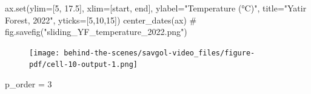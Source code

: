 \documentclass[
  letterpaper,
  DIV=11,
  numbers=noendperiod,
  oneside]{scrreprt}
\newenvironment{Shaded}{\begin{snugshade}}{\end{snugshade}}
\newcommand{\BuiltInTok}[1]{\textcolor[rgb]{0.00,0.23,0.31}{#1}}
\newcommand{\CommentTok}[1]{\textcolor[rgb]{0.37,0.37,0.37}{#1}}
\newcommand{\DecValTok}[1]{\textcolor[rgb]{0.68,0.00,0.00}{#1}}
\newcommand{\FloatTok}[1]{\textcolor[rgb]{0.68,0.00,0.00}{#1}}
\newcommand{\NormalTok}[1]{\textcolor[rgb]{0.00,0.23,0.31}{#1}}
\newcommand{\OperatorTok}[1]{\textcolor[rgb]{0.37,0.37,0.37}{#1}}
\newcommand{\StringTok}[1]{\textcolor[rgb]{0.13,0.47,0.30}{#1}}
\begin{document}
\begin{Shaded}
\begin{Highlighting}[]
\NormalTok{ax.}\BuiltInTok{set}\NormalTok{(ylim}\OperatorTok{=}\NormalTok{[}\DecValTok{5}\NormalTok{, }\FloatTok{17.5}\NormalTok{],}
\NormalTok{       xlim}\OperatorTok{=}\NormalTok{[start, end],}
\NormalTok{       ylabel}\OperatorTok{=}\StringTok{"Temperature (°C)"}\NormalTok{,}
\NormalTok{       title}\OperatorTok{=}\StringTok{"Yatir Forest, 2022"}\NormalTok{,}
\NormalTok{       yticks}\OperatorTok{=}\NormalTok{[}\DecValTok{5}\NormalTok{,}\DecValTok{10}\NormalTok{,}\DecValTok{15}\NormalTok{])}
\NormalTok{center\_dates(ax)}
\CommentTok{\# fig.savefig("sliding\_YF\_temperature\_2022.png")}




\end{Highlighting}
\end{Shaded}

\begin{figure}[H]

{\centering \texttt{[image: behind-the-scenes/savgol-video\_files/figure-pdf/cell-10-output-1.png]}

}

\end{figure}

\begin{Shaded}
\begin{Highlighting}[]
\NormalTok{p\_order }\OperatorTok{=} \DecValTok{3}
\end{Highlighting}
\end{Shaded}
\end{document}
